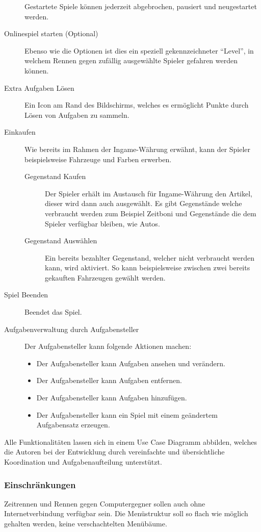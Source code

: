 \begin{description}
{\begin{description}
			\end{description}
			Gestartete Spiele können jederzeit abgebrochen, pausiert und neugestartet werden.
		}
		\item[Onlinespiel starten (Optional)]{ Ebenso wie die Optionen ist dies ein speziell gekennzeichneter \enquote{Level}, in welchem Rennen gegen zufällig ausgewählte Spieler gefahren werden können. }
		\item[Extra Aufgaben Lösen]{ Ein Icon am Rand des Bildschirms, welches es ermöglicht Punkte durch Lösen von Aufgaben zu sammeln. }
		\item[Einkaufen]{ Wie bereits im Rahmen der Ingame-Währung erwähnt, kann der Spieler beispielsweise Fahrzeuge und Farben erwerben.
			\begin{description}
				\item[Gegenstand Kaufen]{ Der Spieler erhält im Austausch für Ingame-Währung den Artikel, dieser wird dann auch ausgewählt. Es gibt Gegenstände welche verbraucht werden zum Beispiel Zeitboni und Gegenstände die dem Spieler verfügbar bleiben, wie Autos. }
				\item[Gegenstand Auswählen]{ Ein bereits bezahlter Gegenstand, welcher nicht verbraucht werden kann, wird aktiviert. So kann beispielsweise zwischen zwei bereits gekauften Fahrzeugen gewählt werden.}
			\end{description}
		}
		\item[Spiel Beenden]{ Beendet das Spiel. }
		\item[Aufgabenverwaltung durch Aufgabensteller]{
			Der Aufgabensteller kann folgende Aktionen machen:
			\begin{itemize}
				\item{ Der Aufgabensteller kann Aufgaben ansehen und verändern. }
				\item{ Der Aufgabensteller kann Aufgaben entfernen. }
				\item{ Der Aufgabensteller kann Aufgaben hinzufügen. }
				\item{ Der Aufgabensteller kann ein Spiel mit einem geändertem Aufgabensatz erzeugen.	}
			\end{itemize}
		}
	\end{description}
	Alle Funktionalitäten lassen sich in einem Use Case Diagramm abbilden, welches die Autoren bei der Entwicklung durch vereinfachte und übersichtliche Koordination und Aufgabenaufteilung unterstützt.
	\label{ssec:ucd}

	\subsubsection{Einschränkungen}
		Zeitrennen und Rennen gegen Computergegner sollen auch ohne Internetverbindung verfügbar sein.
		Die Menüstruktur soll so flach wie möglich gehalten werden, keine verschachtelten Menübäume.
